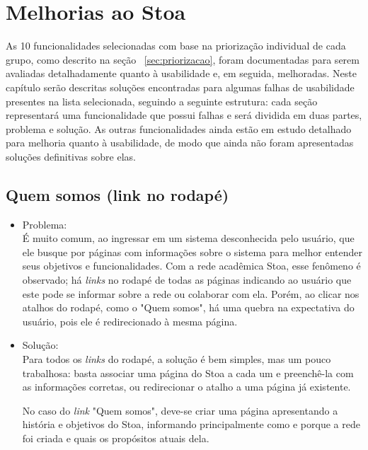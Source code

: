 \chapter{Melhorias ao Stoa}
\label{cap:melhorias}

    As 10 funcionalidades selecionadas com base na priorização individual de cada grupo, como descrito na seção ~\ref{sec:priorizacao}, foram documentadas para serem avaliadas detalhadamente quanto à usabilidade e, em seguida, melhoradas. Neste capítulo serão descritas soluções encontradas para algumas falhas de usabilidade presentes na lista selecionada, seguindo a seguinte estrutura: cada seção representará uma funcionalidade que possui falhas e será dividida em duas partes, problema e solução. As outras funcionalidades ainda estão em estudo detalhado para melhoria quanto à usabilidade, de modo que ainda não foram apresentadas soluções definitivas sobre elas. 


\section{Quem somos (link no rodapé)}
\label{sec:quem-somos}
    \begin{itemize}
    \item Problema:\\
    É muito comum, ao ingressar em um sistema desconhecida pelo usuário, que ele busque por páginas com informações sobre o sistema para melhor entender seus objetivos e funcionalidades. Com a rede acadêmica Stoa, esse fenômeno é observado; há \emph{links} no rodapé de todas as páginas indicando ao usuário que este pode se informar sobre a rede ou colaborar com ela. Porém, ao clicar nos atalhos do rodapé, como o "Quem somos", há uma quebra na expectativa do usuário, pois ele é redirecionado à mesma página.

    \item Solução:\\
    Para todos os \emph{links} do rodapé, a solução é bem simples, mas um pouco trabalhosa: basta associar uma página do Stoa a cada um e preenchê-la com as informações corretas, ou redirecionar o atalho a uma página já existente.
    
    No caso do \emph{link} "Quem somos", deve-se criar uma página apresentando a história e objetivos do Stoa, informando principalmente como e porque a rede foi criada e quais os propósitos atuais dela.
    \end{itemize}

